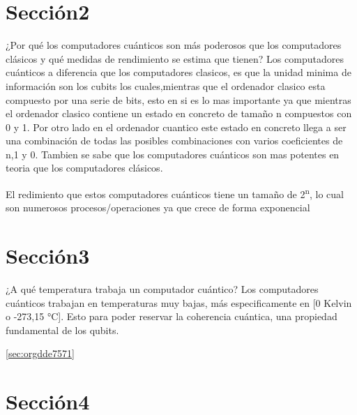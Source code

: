 \documentclass[presentation]{beamer}
\begin{document}
\section{Sección2}
\label{sec:org7f4b454}

\begin{frame}[label={sec:org2b1221f}]{¿Por qué los computadores cuánticos son más poderosos que los computadores clásicos y qué medidas de rendimiento se estima que tienen?}
Los computadores cuánticos a diferencia que los computadores clasicos, es que la unidad minima de información son los cubits los cuales,mientras
que el ordenador clasico esta compuesto por una serie de bits, esto en si es lo mas importante ya que mientras el ordenador clasico contiene
un estado en concreto de tamaño n compuestos con 0 y 1. Por otro lado en el ordenador cuantico este estado en concreto llega a ser una combinación
de todas las posibles combinaciones con varios coeficientes de n,1 y 0.
Tambien se sabe que los computadores cuánticos son mas potentes en teoria que los computadores clásicos.

El redimiento que estos computadores cuánticos tiene un tamaño de \alert{2\textsuperscript{n}}, lo cual son numerosos procesos/operaciones ya que crece de forma \alert{exponencial}
\end{frame}

\section{Sección3}
\label{sec:orgc4e6771}

\begin{frame}[label={sec:org3b0c963}]{¿A qué temperatura trabaja un computador cuántico?}
Los computadores cuánticos trabajan en temperaturas muy bajas, más especificamente en [0 Kelvin o -273,15 °C].
Esto para poder reservar la coherencia cuántica, una propiedad fundamental de los qubits.

\url{}\ref{sec:orgdde7571}
\end{frame}

\section{Sección4}
\label{sec:org27dd18f}
\end{document}
